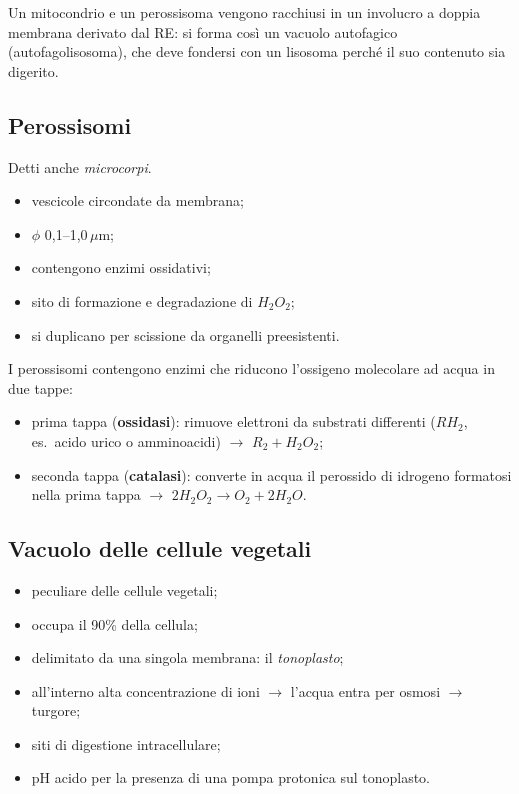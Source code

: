 Un mitocondrio e un perossisoma vengono racchiusi in un involucro a doppia membrana derivato dal RE: si forma così un vacuolo autofagico (autofagolisosoma), che deve fondersi con un lisosoma perché il suo contenuto sia digerito.

\subsection{Perossisomi}

Detti anche \textit{microcorpi}.
\begin{itemize}
  \item vescicole circondate da membrana;
  \item $\phi$ 0,1--1,0\,$\mu$m;
  \item contengono enzimi ossidativi;
  \item sito di formazione e degradazione di $H_2O_2$;
  \item si duplicano per scissione da organelli preesistenti.
\end{itemize}

I perossisomi contengono enzimi che riducono l'ossigeno molecolare ad acqua in due tappe:
\begin{itemize}
  \item prima tappa (\textbf{ossidasi}): rimuove elettroni da substrati differenti ($RH_2$, es.\ acido urico o amminoacidi) $\rightarrow$ $R_2 + H_2O_2$;
  \item seconda tappa (\textbf{catalasi}): converte in acqua il perossido di idrogeno formatosi nella prima tappa $\rightarrow$ $2H_2O_2 \rightarrow O_2 + 2H_2O$.
\end{itemize}

\subsection{Vacuolo delle cellule vegetali}

\begin{itemize}
  \item peculiare delle cellule vegetali;
  \item occupa il 90\% della cellula;
  \item delimitato da una singola membrana: il \textit{tonoplasto};
  \item all'interno alta concentrazione di ioni $\rightarrow$ l'acqua entra per osmosi $\rightarrow$ turgore;
  \item siti di digestione intracellulare;
  \item pH acido per la presenza di una pompa protonica sul tonoplasto.
\end{itemize}
